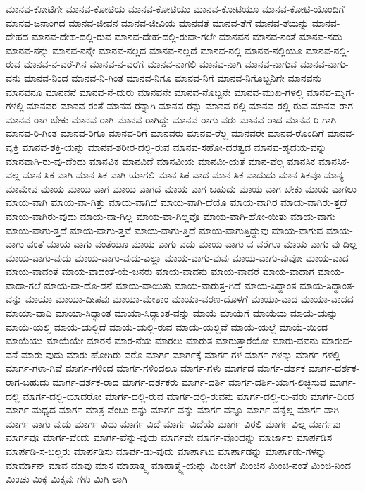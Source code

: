 {ಮಾನವ-ಕೋಟಿಗೇ
ಮಾನವ-ಕೋಟಿಯ
ಮಾನವ-ಕೋಟಿಯು
ಮಾನವ-ಕೋಟಿಯೂ
ಮಾನವ-ಕೋಟಿ-ಯೊಂದಿಗೆ
ಮಾನವ-ಜನಾಂಗದ
ಮಾನವ-ಜೀವನ
ಮಾನವ-ಜೀವಿಯ
ಮಾನವತೆ
ಮಾನವ-ತೆಗೆ
ಮಾನವ-ತೆಯನ್ನು
ಮಾನವ-ದೇಹದ
ಮಾನವ-ದೇಹ-ದಲ್ಲಿ-ರುವ
ಮಾನವ-ದೇಹ-ದಲ್ಲಿ-ರುವಾ-ಗಲೇ
ಮಾನವನ
ಮಾನವ-ನಂತೆ
ಮಾನವ-ನದು
ಮಾನವ-ನನ್ನು
ಮಾನವ-ನನ್ನೇ
ಮಾನವ-ನಲ್ಲದ
ಮಾನವ-ನಲ್ಲದೆ
ಮಾನವ-ನಲ್ಲಿ
ಮಾನವ-ನಲ್ಲಿಯೂ
ಮಾನವ-ನಲ್ಲಿ-ರುವ
ಮಾನವ-ನ-ವರೆ-ಗಿನ
ಮಾನವ-ನ-ವರೆಗೆ
ಮಾನವ-ನಾಗಲಿ
ಮಾನವ-ನಾಗಿ
ಮಾನವ-ನಾಗುವ
ಮಾನವ-ನಾಗು-ವನು
ಮಾನವ-ನಿಂದ
ಮಾನವ-ನಿ-ಗಿಂತ
ಮಾನವ-ನಿಗೂ
ಮಾನವ-ನಿಗೆ
ಮಾನವ-ನಿಗೊಬ್ಬನಿಗೇ
ಮಾನವನು
ಮಾನವನೂ
ಮಾನವನೆ
ಮಾನವ-ನೆ-ದುರು
ಮಾನವನೇ
ಮಾನವ-ನೊಬ್ಬನೇ
ಮಾನವ-ಮುಖ-ಗಳಲ್ಲಿ
ಮಾನವ-ಮೃಗ-ಗಳಲ್ಲಿ
ಮಾನವರ
ಮಾನವ-ರಂತೆ
ಮಾನವ-ರನ್ನಾಗಿ
ಮಾನವ-ರನ್ನು
ಮಾನವ-ರಲ್ಲಿ
ಮಾನವ-ರಲ್ಲಿ-ರುವ
ಮಾನವ-ರಾಗ
ಮಾನವ-ರಾಗ-ಬೇಕು
ಮಾನವ-ರಾಗಿ
ಮಾನವ-ರಾಗಿದ್ದು
ಮಾನವ-ರಾಗು-ವರು
ಮಾನವ-ರಾದ
ಮಾನವ-ರಿ-ಗಾಗಿ
ಮಾನವ-ರಿ-ಗಿಂತ
ಮಾನವ-ರಿಗೂ
ಮಾನವ-ರಿಗೆ
ಮಾನವರು
ಮಾನವ-ರೆಲ್ಲ
ಮಾನವರೇ
ಮಾನವ-ರೊಂದಿಗೆ
ಮಾನವ-ವ್ಯಕ್ತಿ
ಮಾನವ-ಶಕ್ತಿ-ಯನ್ನು
ಮಾನವ-ಶರೀರ-ದಲ್ಲಿ-ರುವ
ಮಾನವ-ಸಹೋ-ದರತ್ವದ
ಮಾನವ-ಹೃದಯ-ವನ್ನು
ಮಾನವಾಗಿ-ರು-ವು-ದೆಂದು
ಮಾನವಿಕ
ಮಾನವಿದೆ
ಮಾನವೀಯ
ಮಾನವೀ-ಯತೆ
ಮಾನ-ವೆಲ್ಲ
ಮಾನಸಿಕ
ಮಾನಸಿಕ-ವಲ್ಲ
ಮಾನ-ಸಿಕ-ವಾಗಿ
ಮಾನ-ಸಿಕ-ವಾಗಿ-ಯಾಗಲಿ
ಮಾನ-ಸಿಕ-ವಾದ
ಮಾನ-ಸಿಕ-ವಾದುದು
ಮಾನ-ಸಿಕವೂ
ಮಾನ್ಯ
ಮಾಮೇವ
ಮಾಯ
ಮಾಯ-ವಾಗ
ಮಾಯ-ವಾಗದೆ
ಮಾಯ-ವಾಗ-ಬಹುದು
ಮಾಯ-ವಾಗ-ಬೇಕು
ಮಾಯ-ವಾಗಲು
ಮಾಯ-ವಾಗಿ
ಮಾಯ-ವಾ-ಗಿತ್ತು
ಮಾಯ-ವಾಗಿದೆ
ಮಾಯ-ವಾಗಿ-ದೆಯೊ
ಮಾಯ-ವಾಗಿರ
ಮಾಯ-ವಾಗಿರು-ತ್ತದೆ
ಮಾಯ-ವಾಗಿರು-ವುದು
ಮಾಯ-ವಾ-ಗಿಲ್ಲ
ಮಾಯ-ವಾ-ಗಿಲ್ಲವೊ
ಮಾಯ-ವಾಗಿ-ಹೋ-ಯಿತು
ಮಾಯ-ವಾಗು
ಮಾಯ-ವಾಗು-ತ್ತದೆ
ಮಾಯ-ವಾಗು-ತ್ತವೆ
ಮಾಯ-ವಾಗು-ತ್ತಿದೆ
ಮಾಯ-ವಾಗುತ್ತಿದ್ದುವು
ಮಾಯ-ವಾಗುವ
ಮಾಯ-ವಾಗು-ವಂತೆ
ಮಾಯ-ವಾಗು-ವಂತೆಯೂ
ಮಾಯ-ವಾಗು-ವದು
ಮಾಯ-ವಾಗು-ವ-ವರೆಗೂ
ಮಾಯ-ವಾಗು-ವು-ದಿಲ್ಲ
ಮಾಯ-ವಾಗು-ವುದು
ಮಾಯ-ವಾಗು-ವುದು-ಎಲ್ಲಾ
ಮಾಯ-ವಾಗು-ವುವು
ಮಾಯ-ವಾಗು-ವುವೋ
ಮಾಯ-ವಾದ
ಮಾಯ-ವಾದಂತೆ
ಮಾಯ-ವಾದಂತೆ-ಯೆ-ಜನರು
ಮಾಯ-ವಾದನು
ಮಾಯ-ವಾದರೆ
ಮಾಯ-ವಾದಾಗ
ಮಾಯ-ವಾದಾ-ಗಲೆ
ಮಾಯ-ವಾ-ದೊ-ಡನೆ
ಮಾಯ-ವಾಯಿತು
ಮಾಯ-ವಾರುತ್ತ-ಗಿದೆ
ಮಾಯ-ಸಿದ್ದಾಂತ
ಮಾಯ-ಸಿದ್ಧಾಂತ-ವನ್ನು
ಮಾಯಾ
ಮಾಯಾ-ದೀಪವು
ಮಾಯಾ-ಮೇತಾಂ
ಮಾಯಾ-ವರಣ-ದೊಳಗೆ
ಮಾಯಾ-ವಾದ
ಮಾಯಾ-ವಾದದ
ಮಾಯಾ-ವಾದಿ
ಮಾಯಾ-ಸಿದ್ಧಾಂತ
ಮಾಯಾ-ಸಿದ್ಧಾಂತ-ವನ್ನು
ಮಾಯೆ
ಮಾಯೆಗೆ
ಮಾಯೆಯ
ಮಾಯೆ-ಯನ್ನು
ಮಾಯೆ-ಯಲ್ಲಿ
ಮಾಯೆ-ಯಲ್ಲಿದೆ
ಮಾಯೆ-ಯಲ್ಲಿ-ರುವ
ಮಾಯೆ-ಯಲ್ಲಿವೆ
ಮಾಯೆ-ಯಲ್ಲೆ
ಮಾಯೆ-ಯಿಂದ
ಮಾಯೆಯು
ಮಾಯೆಯೇ
ಮಾರನೆ
ಮಾರ-ನೆಯ
ಮಾರಲು
ಮಾರುತ
ಮಾರುತ್ತಾರೆಯೋ
ಮಾರು-ವವನು
ಮಾರುವ-ವನೆ
ಮಾರು-ವುದು
ಮಾರು-ಹೋಗಿರು-ವರೊ
ಮಾರ್ಗ
ಮಾರ್ಗಕ್ಕೆ
ಮಾರ್ಗ-ಗಳ
ಮಾರ್ಗ-ಗಳನ್ನು
ಮಾರ್ಗ-ಗಳಲ್ಲಿ
ಮಾರ್ಗ-ಗಳಾ-ಗಿವೆ
ಮಾರ್ಗ-ಗಳಿಂದ
ಮಾರ್ಗ-ಗಳಿಂದಲೂ
ಮಾರ್ಗ-ಗಳು
ಮಾರ್ಗದ
ಮಾರ್ಗ-ದರ್ಶಕ
ಮಾರ್ಗ-ದರ್ಶಕ-ರಾಗ-ಬಹುದು
ಮಾರ್ಗ-ದರ್ಶಕ-ರಾದ
ಮಾರ್ಗ-ದರ್ಶಕರು
ಮಾರ್ಗ-ದರ್ಶಿ
ಮಾರ್ಗ-ದರ್ಶಿ-ಯಾಗ-ಲಿಚ್ಛಿಸುವ
ಮಾರ್ಗ-ದಲ್ಲಿ
ಮಾರ್ಗ-ದಲ್ಲಿ-ಯಾದರೋ
ಮಾರ್ಗ-ದಲ್ಲಿ-ರುವ
ಮಾರ್ಗ-ದಲ್ಲಿ-ರುವನು
ಮಾರ್ಗ-ದಲ್ಲಿ-ರು-ವರು
ಮಾರ್ಗ-ದಿಂದ
ಮಾರ್ಗ-ಮಧ್ಯದ
ಮಾರ್ಗ-ಮಾತ್ರ-ವೆಂಬು-ದನ್ನು
ಮಾರ್ಗ-ವನ್ನು
ಮಾರ್ಗ-ವನ್ನೂ
ಮಾರ್ಗ-ವನ್ನೆಲ್ಲ
ಮಾರ್ಗ-ವಾಗಿ
ಮಾರ್ಗ-ವಾಗು-ವುದು
ಮಾರ್ಗ-ವಿದು
ಮಾರ್ಗ-ವಿದೆ
ಮಾರ್ಗ-ವಿದೆಯೆ
ಮಾರ್ಗ-ವಿರಲಿ
ಮಾರ್ಗ-ವಿಲ್ಲ
ಮಾರ್ಗವು
ಮಾರ್ಗವೂ
ಮಾರ್ಗ-ವೆಂದು
ಮಾರ್ಗ-ವೆನ್ನು-ವುದು
ಮಾರ್ಗವೇ
ಮಾರ್ಗ-ವೊಂದನ್ನು
ಮಾರ್ಜಾಲ
ಮಾರ್ಪಡಿಸ
ಮಾರ್ಪಡಿ-ಸ-ಬಲ್ಲರು
ಮಾರ್ಪಡಿಸು
ಮಾರ್ಪ-ಡು-ವುದು
ಮಾರ್ಪಾಟು
ಮಾರ್ಪಾಡನ್ನು
ಮಾರ್ಪಾಡು-ಗಳನ್ನು
ಮಾರ್ಮಾನ್
ಮಾವ
ಮಾವು
ಮಾಸ
ಮಾಹಾತ್ಮ್ಯ
ಮಾಹಾತ್ಮ್ಯೆ-ಯನ್ನು
ಮಿಂಚಿಗೆ
ಮಿಂಚಿನ
ಮಿಂಚಿ-ನಂತೆ
ಮಿಂಚಿ-ನಿಂದ
ಮಿಂಚು
ಮಿಕ್ಕ
ಮಿಕ್ಕವು-ಗಳು
ಮಿಗಿ-ಲಾಗಿ
}
